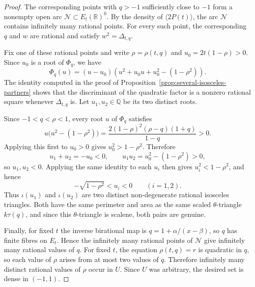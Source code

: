 \documentclass[11pt]{amsart}
\theoremstyle{plain}
\theoremstyle{remark}
\theoremstyle{plain}
\newcommand{\Q}{\mathbb{Q}}
\newcommand{\R}{\mathbb{R}}
\begin{document}
\begin{proof}
The corresponding points with $q>-1$ sufficiently close to $-1$
form a nonempty open arc $\mathcal N\subset E_t(\R)^0$. By the
density of $\langle2P(t)\rangle$, the arc $\mathcal N$ contains
infinitely many rational points. For every such point, the
corresponding $q$ and $w$ are rational and satisfy
$w^2=\Delta_{t,q}$.

Fix one of these rational points and write
$\rho=\rho(t,q)$ and $u_0=2t(1-\rho)>0$. Since $u_0$ is a root of
$\Phi_q$, we have
\[
\Phi_q(u)
=
(u-u_0)
\left(
u^2+u_0u+u_0^2-(1-\rho^2)
\right).
\]
The identity computed in the proof of
Proposition~\ref{prop:several-isosceles-partners} shows that the
discriminant of the quadratic factor is a nonzero rational square
whenever $\Delta_{t,q}$ is. Let $u_1,u_2\in\Q$ be its two distinct
roots.

Since $-1<q<\rho<1$, every root $u$ of $\Phi_q$ satisfies
\[
u\bigl(u^2-(1-\rho^2)\bigr)
=
\frac{2(1-\rho)^2(\rho-q)(1+q)}{1-q}>0.
\]
Applying this first to $u_0>0$ gives $u_0^2>1-\rho^2$. Therefore
\[
u_1+u_2=-u_0<0,
\qquad
u_1u_2=u_0^2-(1-\rho^2)>0,
\]
so $u_1,u_2<0$. Applying the same identity to each $u_i$ then gives
$u_i^2<1-\rho^2$, and hence
\[
-\sqrt{1-\rho^2}<u_i<0
\qquad (i=1,2).
\]
Thus $\iota(u_1)$ and $\iota(u_2)$ are two distinct non-degenerate
rational isosceles triangles. Both have the same perimeter and area
as the same scaled $\theta$-triangle $k\tau(q)$, and since this
$\theta$-triangle is scalene, both pairs are genuine.

Finally, for fixed $t$ the inverse birational map is
$q=1+\alpha/(x-\beta)$, so $q$ has finite fibres on $E_t$. Hence the
infinitely many rational points of $\mathcal N$ give infinitely many
rational values of $q$. For fixed $t$, the equation
$\rho(t,q)=r$ is quadratic in $q$, so each value of $\rho$ arises from
at most two values of $q$. Therefore infinitely many distinct rational
values of $\rho$ occur in $U$. Since $U$ was arbitrary, the desired
set is dense in $(-1,1)$.
\end{proof}
\end{document}
